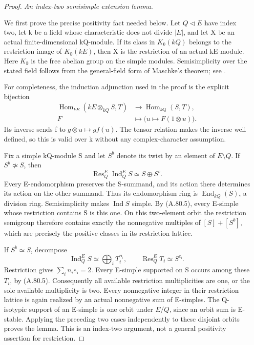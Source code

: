\begin{proof}
\emph{An index-two semisimple extension lemma.}\par
We first prove the precise positivity fact needed below. Let
\(Q\lhd E\) have index two, let k be a field whose
characteristic does not divide \(|E|\), and let X be an actual
finite-dimensional kQ-module. If its class in \(K_0(kQ)\)
belongs to the restriction image of \(K_0(kE)\), then X is
the restriction of an actual kE-module. Here \(K_0\) is the
free abelian group on the simple modules. Semisimplicity over
the stated field follows from the general-field form of
Maschke's theorem; see \citet[Theorem~7.4 and
Proposition~7.9]{AMilne2025}.

For completeness, the induction adjunction used in the proof
is the explicit bijection
\[
 \begin{aligned}
 \operatorname{Hom}_{kE}(kE\otimes_{kQ}S,T)
       &\longrightarrow\operatorname{Hom}_{kQ}(S,T),\\
 F&\longmapsto\bigl(u\mapsto F(1\otimes u)\bigr).
 \end{aligned}
 \tag{A.80.5}
\]
Its inverse sends f to \(g\otimes u\mapsto g f(u)\).
The tensor relation makes the inverse well defined, so this
is valid over k without any complex-character assumption.

Fix a simple kQ-module S and let \(S^b\) denote its twist
by an element of \(E\setminus Q\). If \(S^b\not\simeq S\),
then
\[
 \operatorname{Res}_Q^E\operatorname{Ind}_Q^E S
           \simeq S\oplus S^b.
\]
Every E-endomorphism preserves the S-summand, and its action
there determines its action on the other summand. Thus its
endomorphism ring is \(\operatorname{End}_{kQ}(S)\), a
division ring. Semisimplicity makes \(\operatorname{Ind}S\)
simple. By (A.80.5), every E-simple whose restriction contains
S is this one. On this two-element orbit the restriction
semigroup therefore contains exactly the nonnegative multiples
of \([S]+[S^b]\), which are precisely the positive classes in
its restriction lattice.

If \(S^b\simeq S\), decompose
\[
 \operatorname{Ind}_Q^E S\simeq\bigoplus_i T_i^{n_i},
 \qquad \operatorname{Res}_Q^E T_i\simeq S^{e_i}.
\]
Restriction gives \(\sum_i n_i e_i=2\). Every E-simple
supported on S occurs among these \(T_i\), by (A.80.5).
Consequently all available restriction multiplicities are one,
or the sole available multiplicity is two. Every nonnegative
integer in their restriction lattice is again realized by an
actual nonnegative sum of E-simples. The Q-isotypic support of
an E-simple is one orbit under \(E/Q\), since an orbit sum is
E-stable. Applying the preceding two cases independently to
these disjoint orbits proves the lemma. This is an index-two
argument, not a general positivity assertion for restriction.


\end{proof}
